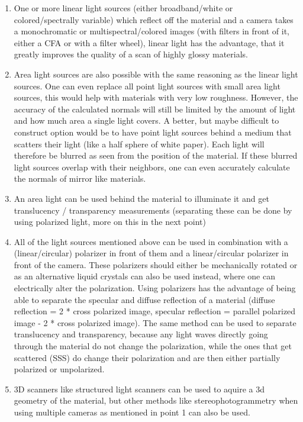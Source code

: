\documentclass[11pt, twoside, listof=totocnumbered, bibliography=totocnumbered]{scrartcl}
\begin{document}
\begin{enumerate}
	\item One or more linear light sources (either broadband/white or colored/spectrally variable) which reflect off the material and a camera takes a monochromatic or multispectral/colored images (with filters in front of it, either a CFA or with a filter wheel), linear light has the advantage, that it greatly improves the quality of a scan of highly glossy materials.
	\item Area light sources are also possible with the same reasoning as the linear light sources. One can even replace all point light sources with small area light sources, this would help with materials with very low roughness. However, the accuracy of the calculated normals will still be limited by the amount of light and how much area a single light covers. A better, but maybe difficult to construct option would be to have point light sources behind a medium that scatters their light (like a half sphere of white paper). Each light will therefore be blurred as seen from the position of the material. If these blurred light sources overlap with their neighbors, one can even accurately calculate the normals of mirror like materials. \cite{PS_AreaLights}
	\item An area light can be used behind the material to illuminate it and get translucency / transparency measurements (separating these can be done by using polarized light, more on this in the next point)
	\item All of the light sources mentioned above can be used in combination with a (linear/circular) polarizer in front of them and a linear/circular polarizer in front of the camera. These polarizers should either be mechanically rotated or as an alternative liquid crystals can also be used instead, where one can electrically alter the polarization. Using polarizers has the advantage of being able to separate the specular and diffuse reflection of a material (diffuse reflection = 2 * cross polarized image, specular reflection = parallel polarized image - 2 * cross polarized image). The same method can be used to separate translucency and transparency, because any light waves directly going through the material do not change the polarization, while the ones that get scattered (SSS) do change their polarization and are then either partially polarized or unpolarized.	
	\item 3D scanners like structured light scanners can be used to aquire a 3d geometry of the material, but other methods like stereophotogrammetry when using multiple cameras as mentioned in point 1 can also be used.

\end{enumerate}
\end{document}
